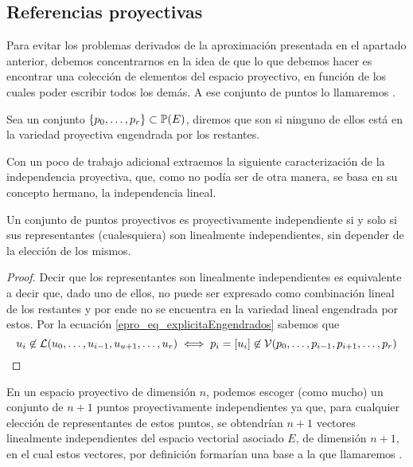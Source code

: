 \subsection{Referencias proyectivas}
Para evitar los problemas derivados de la aproximación presentada en el apartado anterior, debemos concentrarnos en la idea de que lo que debemos hacer es encontrar una colección de elementos del espacio proyectivo, en función de los cuales poder escribir todos los demás. A ese conjunto de puntos lo llamaremos .
\begin{defi}
	\label{epro_def_independenciaProyectiva}
	Sea un conjunto $\{p_0,\dots,p_r\}\subset\mathbb{P}(E)$, diremos que son  si ninguno de ellos está en la variedad proyectiva engendrada por los restantes.
\end{defi}
Con un poco de trabajo adicional extraemos la siguiente caracterización de la independencia proyectiva, que, como no podía ser de otra manera, se basa en su concepto hermano, la independencia lineal.
\begin{lem}
	\label{epro_lem_caracterizacionIndependencia}
	Un conjunto de puntos proyectivos es proyectivamente independiente si y solo si sus representantes (cualesquiera) son linealmente independientes, sin depender de la elección de los mismos. 
\end{lem}
\begin{proof}
	Decir que los representantes son linealmente independientes es equivalente a decir que, dado uno de ellos, no puede ser expresado como combinación lineal de los restantes y por ende no se encuentra en la variedad lineal engendrada por estos. Por la ecuación \eqref{epro_eq_explicitaEngendrados} sabemos que
	\begin{equation*}
		u_i\not\in\mathcal{L}(u_0,\dots,u_{i-1},u_{u+1},\dots,u_{r})\iff p_i=\left [ u_i \right ]\not\in\mathcal{V}(p_0,\dots,p_{i-1},p_{i+1},\dots,p_r)\qedhere
	\end{equation*}
\end{proof}
\begin{obs}
	\label{epro_obs_baseInducida}
	En un espacio proyectivo de dimensión $n$, podemos escoger (como mucho) un conjunto de $n+1$ puntos proyectivamente independientes ya que, para cualquier elección de representantes de estos puntos, se obtendrían $n+1$ vectores linealmente independientes del espacio vectorial asociado $E$, de dimensión $n+1$, en el cual estos vectores, por definición formarían una base a la que llamaremos .
\end{obs}
